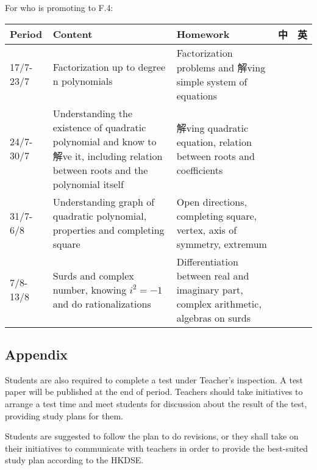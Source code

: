 \documentclass{article}
\begin{document}
    For who is promoting to F.4:
    \begin{center}
        \begin{tabular}{|m{2cm}|m{6cm}|m{6cm}|m{1cm}|m{1cm}|}
            \hline
            Period&Content&Homework&中&英\\
            \hline
            17/7-23/7&Factorization up to degree n polynomials&Factorization problems and 解ving simple system of equations&&\\
            \hline
            24/7-30/7&Understanding the existence of quadratic polynomial and know to 解ve it, including relation between roots and the polynomial itself& 解ving quadratic equation, relation between roots and coefficients&&\\
            \hline
            31/7-6/8&Understanding graph of quadratic polynomial, properties and completing square&Open directions, completing square, vertex, axis of symmetry, extremum&&\\
            \hline
            7/8-13/8&Surds and complex number, knowing $i^2=-1$ and do rationalizations&Differentiation between real and imaginary part, complex arithmetic, algebras on surds&&\\
            \hline
        \end{tabular}
    \end{center}

    \subsection*{Appendix}

    Students are also required to complete a test under Teacher's inspection. A test paper will be published at the end of period. Teachers should take initiatives to arrange a test time and meet students for discussion about the result of the test, providing study plans for them.

    Students are suggested to follow the plan to do revisions, or they shall take on their initiatives to communicate with teachers in order to provide the best-suited study plan according to the HKDSE.
\end{document}
